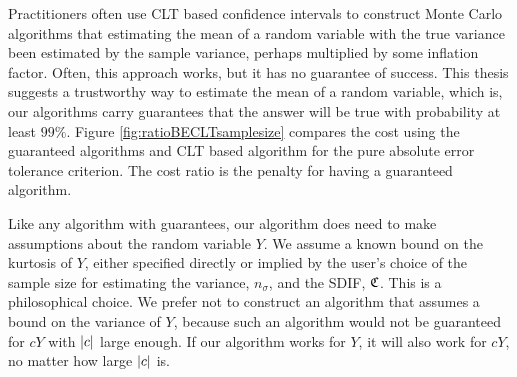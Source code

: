 \documentclass{iitthesis}
\theoremstyle{definition}
\begin{document}
Practitioners often use CLT based confidence intervals to construct Monte Carlo algorithms that estimating the mean of a random variable with the true variance been estimated by the sample variance, perhaps multiplied by some inflation factor. Often, this approach works, but it has no guarantee of success. This thesis suggests a trustworthy way to estimate the mean of a random variable, which is, our algorithms carry guarantees that the answer will be true with probability at least $99\%$. Figure \ref{fig:ratioBECLTsamplesize} compares the cost using the guaranteed algorithms and CLT based algorithm for the pure absolute error tolerance criterion. The cost ratio is the penalty for having a guaranteed algorithm.
%
%
%
%
%
%
%
%

Like any algorithm with guarantees, our algorithm does need to make assumptions about the random variable $Y$.  We assume a known bound on the kurtosis of $Y$, either specified directly or implied by the user's choice of the sample size for estimating the variance, $n_\sigma$, and the SDIF, $\mathfrak{C}$.  This is a philosophical choice.  We prefer not to construct an algorithm that assumes a bound on the variance of $Y$, because such an algorithm would not be guaranteed for $cY$ with $\left \lvert c \right \rvert$ large enough.  If our algorithm works for $Y$, it will also work for $cY$, no matter how large $\left \lvert c \right \rvert$ is. 
\end{document}
